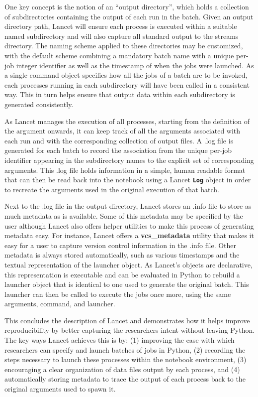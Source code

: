 \documentclass[phd,ianc,twoside]{infthesis}
\newcommand{\tbf}[1]{\texttt{\textbf{#1}}}
\begin{document}
One key concept is the notion of an ``output directory'', which holds a
collection of subdirectories containing the output of each run in the
batch. Given an output directory path, Lancet will ensure each process
is executed within a suitable named subdirectory and will also capture
all standard output to the \textsf{streams} directory. The naming scheme
applied to these directories may be customized, with the default scheme
combining a mandatory batch name with a unique per-job integer
identifier as well as the timestamp of when the jobs were launched. As a
single command object specifies how all the jobs of a batch are to be
invoked, each processes running in each subdirectory will have been
called in a consistent way. This in turn helps ensure that output data
within each subdirectory is generated consistently.

As Lancet manages the execution of all processes, starting from the
definition of the argument onwards, it can keep track of all the
arguments associated with each run and with the corresponding collection
of output files. A \textsf{.log} file is generated for each batch to
record the association from the unique per-job identifier appearing in
the subdirectory names to the explicit set of corresponding
arguments. This \textsf{.log} file holds information in a simple, human
readable format that can then be read back into the notebook using a
Lancet \tbf{Log} object in order to recreate the arguments used in the
original execution of that batch.

Next to the \textsf{.log} file in the output directory, Lancet stores an
\textsf{.info} file to store as much metadata as is available. Some of
this metadata may be specified by the user although Lancet also offers
helper utilities to make this process of generating metadata easy. For
instance, Lancet offers a \textbf{vcs\_metadata} utility that makes it
easy for a user to capture version control information in the
\textsf{.info} file. Other metadata is always stored automatically, such
as various timestamps and the textual representation of the launcher
object. As Lancet's objects are declarative, this representation is
executable and can be evaluated in Python to rebuild a launcher object
that is identical to one used to generate the original batch. This
launcher can then be called to execute the jobs once more, using the
same arguments, command, and launcher.

This concludes the description of Lancet and demonstrates how it helps
improve reproducibility by better capturing the researchers intent
without leaving Python. The key ways Lancet achieves this is by: (1)
improving the ease with which researchers can specify and launch batches
of jobs in Python, (2) recording the steps necessary to launch these
processes within the notebook environment, (3) encouraging a clear
organization of data files output by each process, and (4) automatically
storing metadata to trace the output of each process back to the
original arguments used to spawn it.
\end{document}
